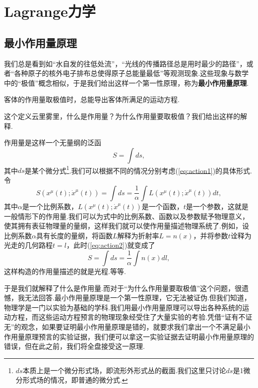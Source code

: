 \section{Lagrange力学}\label{sec:Lagrange}
	
	\subsection{最小作用量原理}
		我们总是看到如“水自发的往低处流”，“光线的传播路径总是用时最少的路径”，或者“各种原子的核外电子排布总使得原子总能量最低”等观测现象.这些现象与数学中的“极值”概念相似，于是我们给出这样一个第一性原理，称为\textbf{最小作用量原理}.
		\begin{definition}
			客体的作用量取极值时，总能导出客体所满足的运动方程.
		\end{definition}
		这个定义云里雾里，什么是作用量？为什么作用量要取极值？我们给出这样的解释.
		
		作用量是这样一个无量纲的泛函
		\begin{equation}\label{eq:action1}
			S=\int ds,
		\end{equation}
		其中$ds$是某个微分式\footnote{$ds$本质上是一个微分形式场，即流形外形式丛的截面.我们这里只讨论$ds$是1微分形式场的情况，即普通的微分式.}.我们可以根据不同的情况分别考虑(\ref{eq:action1})的具体形式.令
		\begin{equation}\label{eq:action2}
			S(x^\mu(t);\dot{x}^\mu(t))=\int ds=\frac{1}{\alpha}\int L(x^\mu(t);\dot{x}^\mu(t))dt,
		\end{equation}
		其中$\alpha$是一个比例系数，$L(x^\mu(t);\dot{x}^\mu(t))$是一个函数，$t$是一个参数，这就是一般情形下的作用量.我们可以为式中的比例系数、函数以及参数赋予物理意义，使其拥有表征物理量的量纲，这样我们就可以使作用量描述物理系统了.例如，设比例系数$\alpha$具有长度的量纲，将函数$L$解释为折射率$L=n(x)$，并将参数$t$诠释为光走的几何路程$t=l$，此时(\ref{eq:action2})就变成了
		$$S=\int ds=\frac{1}{\alpha}\int n(x)dl,$$
		这样构造的作用量描述的就是光程.等等.

		于是我们就解释了什么是作用量.而对于“为什么作用量要取极值”这个问题，很遗憾，我无法回答.最小作用量原理是一个第一性原理，它无法被证伪.但我们知道，物理学是一门以实验为基础的学科.我们用最小作用量原理可以导出各种系统的运动方程，而这些运动方程预言的物理现象经受住了大量实验的考验.凭借“证有不证无”的观念，如果要证明最小作用量原理是错的，就要求我们拿出一个不满足最小作用量原理预言的实验证据，我们便可以拿这一实验证据去证明最小作用量原理的错误，但在此之前，我们将全盘接受这一原理.

		
		